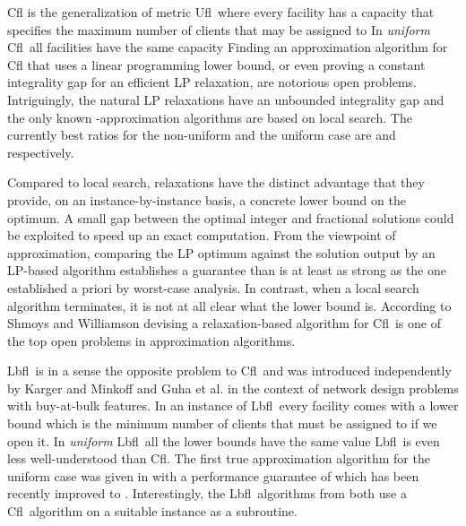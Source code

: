 \documentclass[11pt]{article}\usepackage{amsmath}
\newcommand{\lbfl}{{\sc Lbfl}}
\newcommand{\cfl}{{\sc Cfl}}
\newcommand{\ufl}{{\sc Ufl}}
\begin{document}
\cfl\/ is the  generalization of metric \ufl\ where every facility  has a
capacity   that specifies  the maximum number of clients that may
be
assigned to  In {\em uniform} \cfl\ all facilities have
the same capacity   
  Finding an approximation algorithm for  \cfl\/ that uses a linear programming
lower bound, or even proving a constant integrality gap for an
efficient  LP
relaxation, are notorious open problems. Intriguingly, 
the  natural LP relaxations  have 
an unbounded integrality gap and
the only known  -approximation algorithms are
based on local search.  The currently best ratios 
for the non-uniform  and the uniform case are  \cite{BansalGG12} and   
\cite{AggarwalLBGGJ12} respectively. 
\iffalse ----------------
Approximation algorithms that use LP
lower bounds are known for 
 the {\em soft capacitated} \cfl\  where multiple copies of a facility
may be opened \cite{ShmoysTA97}  
and   the special case 
where all  facilities have  equal opening cost \cite{LeviSS12}. 
-------- \fi 
Compared to local search, relaxations have 
the distinct advantage that they provide, on an instance-by-instance basis,
a  concrete  lower
bound on the optimum. A small  gap between the
optimal integer and fractional solutions  could be exploited
to speed up an exact  computation. From the viewpoint of
approximation, 
comparing the LP optimum against the  solution  output by an
LP-based algorithm establishes 
a  guarantee than is at least as strong as the one established  a priori by  worst-case
analysis.
In contrast, when a  local search algorithm terminates, 
it is not at all clear what the lower
bound is. 
According to Shmoys and Williamson \cite{ShmoysWbook} devising 
a relaxation-based algorithm for \cfl\  is one of
the top  open problems in approximation algorithms. 



 \lbfl\ is in a sense the opposite problem to \cfl\ and 
was introduced independently by Karger and Minkoff \cite{KargerM00} and Guha et
al. \cite{GuhaMM00} in the context of network design problems with buy-at-bulk
features.  In an instance of \lbfl\ every facility  comes with a  lower
bound  
which is the minimum number of clients that must be assigned
 to   if we open it. In {\em uniform} \lbfl\ all the lower bounds
have the same value   \lbfl\ is even less well-understood than \cfl. 
The first true approximation algorithm for the uniform case 
was given in \cite{Svitkina08} with a performance guarantee of
 which has been recently improved  to  \cite{AhmadianS12}. 
Interestingly, the \lbfl\ algorithms
from \cite{Svitkina08,AhmadianS12}  both use a \cfl\ algorithm on a
suitable instance as a subroutine. 
\end{document}
